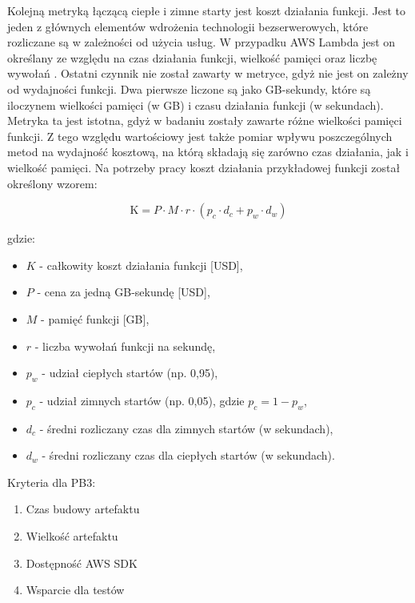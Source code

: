 Kolejną metryką łączącą ciepłe i zimne starty jest koszt działania funkcji.
Jest to jeden z głównych elementów wdrożenia technologii bezserwerowych, które rozliczane są w zależności od użycia usług.
W przypadku AWS Lambda jest on określany ze względu na czas działania funkcji, wielkość pamięci oraz liczbę wywołań \cite{awsLambdaPricing}.
Ostatni czynnik nie został zawarty w metryce, gdyż nie jest on zależny od wydajności funkcji.
Dwa pierwsze liczone są jako GB-sekundy, które są iloczynem wielkości pamięci (w GB) i czasu działania funkcji (w sekundach).
Metryka ta jest istotna, gdyż w badaniu zostały zawarte różne wielkości pamięci funkcji.
Z tego względu wartościowy jest także pomiar wpływu poszczególnych metod na wydajność kosztową, na którą składają się zarówno czas działania, jak i wielkość pamięci.
Na potrzeby pracy koszt działania przykładowej funkcji został określony wzorem:

\[
\text{K} = P \cdot M \cdot  r \cdot \left( p_c \cdot d_c + p_w \cdot d_w \right)
\]

gdzie:
\begin{itemize}
  \item \( K \) - całkowity koszt działania funkcji [USD],
  \item \( P \) - cena za jedną GB-sekundę [USD],
  \item \( M \) - pamięć funkcji [GB],
  \item \( r \) - liczba wywołań funkcji na sekundę,
  \item \( p_w \) - udział ciepłych startów (np. 0,95),
  \item \( p_c \) - udział zimnych startów (np. 0,05), gdzie \( p_c = 1 - p_w \),
  \item \( d_c \) - średni rozliczany czas dla zimnych startów (w sekundach),
  \item \( d_w \) - średni rozliczany czas dla ciepłych startów (w sekundach).
\end{itemize}

Kryteria dla PB3:

\begin{enumerate}
    \item Czas budowy artefaktu
    \item Wielkość artefaktu
    \item Dostępność AWS SDK
    \item Wsparcie dla testów
\end{enumerate}

